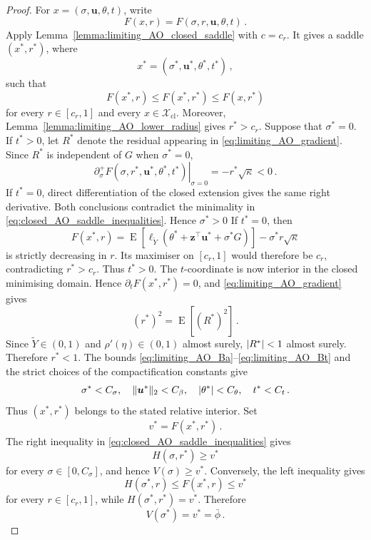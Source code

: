 \documentclass{article}
\makeatletter
\DeclareMathOperator{\expect}{E}
\theoremstyle{definition}
\newcommand{\vnorm}[1]{%
	\ensuremath{%
		\if@display
		\left\| #1 \right\|
		\else
		\| #1 \|
		\fi
	}%
}
\newcommand{\abs}[1]{%
	\ensuremath{%
		\if@display
		\left| #1 \right|
		\else
		\lvert #1 \rvert
		\fi
	}%
}
\newcommand*{\bb}{\boldsymbol}
\def\bu{\bb{u}}
\def\Ytil{\widetilde{Y}}
\def\bz{\bb{z}}
\makeatother
\begin{document}
\begin{bibunit}
\begin{proof}
For $x=(\sigma,\bu,\theta,t)$, write
$$
    F(x,r)
    =
    F(\sigma,r,\bu,\theta,t)\,.
$$
Apply Lemma~\ref{lemma:limiting_AO_closed_saddle} with $c=c_r$.
It gives a saddle $(x^*,r^*)$, where
$$
    x^*
    =
    (\sigma^*,\bu^*,\theta^*,t^*)\,,
$$
such that
\begin{equation}
\label{eq:closed_AO_saddle_inequalities}
    F(x^*,r)
    \leq
    F(x^*,r^*)
    \leq
    F(x,r^*)
\end{equation}
for every $r\in[c_r,1]$ and every
$x\in\mathcal X_{\mathrm{cl}}$. Moreover,
Lemma~\ref{lemma:limiting_AO_lower_radius} gives
$r^*>c_r$.
Suppose that $\sigma^*=0$. If $t^*>0$, let $R^*$ denote the residual
appearing in \eqref{eq:limiting_AO_gradient}. Since $R^*$ is independent
of $G$ when $\sigma^*=0$,
$$
    \left.
    \partial_\sigma^+
    F(\sigma,r^*,\bu^*,\theta^*,t^*)
    \right|_{\sigma=0}
    =
    -r^*\sqrt\kappa
    <
    0\,.
$$
If $t^*=0$, direct differentiation of the closed extension gives the
same right derivative. Both conclusions contradict the minimality in
\eqref{eq:closed_AO_saddle_inequalities}. Hence $\sigma^*>0$
If $t^*=0$, then
$$
    F(x^*,r)
    =
    \expect\left[
        \ell_{\Ytil}
        \left(
            \theta^*+\bz^\top\bu^*+\sigma^*G
        \right)
    \right]
    -
    \sigma^*r\sqrt\kappa
$$
is strictly decreasing in $r$. Its maximiser on $[c_r,1]$ would therefore
be $c_r$, contradicting $r^*>c_r$. Thus $t^*>0$.
The $t$-coordinate is now interior in the closed minimising domain. Hence
$\partial_tF(x^*,r^*)=0$, and
\eqref{eq:limiting_AO_gradient} gives
$$
    (r^*)^2
    =
    \expect[(R^*)^2]\,.
$$
Since $\Ytil\in(0,1)$ and $\rho'(\eta)\in(0,1)$ almost surely,
$\abs{R^*}<1$ almost surely. Therefore $r^*<1$.
The bounds
\eqref{eq:limiting_AO_Ba}--\eqref{eq:limiting_AO_Bt} and the strict
choices of the compactification constants give
$$
    \sigma^*<C_\sigma,
    \quad
    \vnorm{\bu^*}_2<C_\beta,
    \quad
    \abs{\theta^*}<C_\theta,
    \quad
    t^*<C_t\,.
$$
Thus $(x^*,r^*)$ belongs to the stated relative interior.
Set
$$
    v^*
    =
    F(x^*,r^*)\,.
$$
The right inequality in
\eqref{eq:closed_AO_saddle_inequalities} gives
$$
    H(\sigma,r^*)
    \geq
    v^*
$$
for every $\sigma\in[0,C_\sigma]$, and hence
$V(\sigma)\geq v^*$. Conversely, the left inequality gives
$$
    H(\sigma^*,r)
    \leq
    F(x^*,r)
    \leq
    v^*
$$
for every $r\in[c_r,1]$, while
$H(\sigma^*,r^*)=v^*$. Therefore
$$
    V(\sigma^*)=v^*=\bar\phi\,.
$$


\end{proof}
\end{bibunit}
\end{document}
